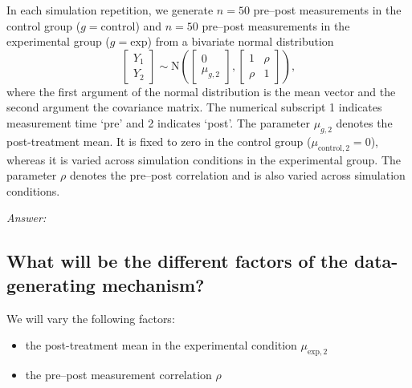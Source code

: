 \documentclass[12pt]{article}
\begin{document}
\begin{examplebox}
In each simulation repetition, we generate $n=50$ pre--post measurements in the control group ($g = \text{control}$) and $n = 50$ pre--post measurements in the experimental group ($g = \text{exp}$) from a bivariate normal distribution
\begin{equation}
    \label{eq:bivariateNormal}
    \left[\begin{array}{c}Y_1 \\ Y_2 \end{array}\right] \sim\text{N}\left(\left[\begin{array}{c}0 \\ \mu_{g,2} \end{array}\right],\left[\begin{array}{cc} 1 & \rho  \\ \rho & 1 \end{array}\right]\right),
\end{equation}
where the first argument of the normal distribution is the mean vector and the second argument the covariance matrix.
The numerical subscript 1 indicates measurement time `pre' and 2 indicates `post'. The parameter $\mu_{g,2}$ denotes the post-treatment mean. It is fixed to zero in the control group (${\mu_{\text{control},2}} = 0$), whereas it is varied across simulation conditions in the experimental group. The parameter $\rho$ denotes the pre--post correlation and is also varied across simulation conditions. 
\end{examplebox}

\textit{Answer:}

\subsection{What will be the different factors of the data-generating mechanism?} 


\begin{examplebox}
We will vary the following factors:
\begin{itemize}
    \item the post-treatment mean in the experimental condition ${\mu_{\text{exp},2}}$
    \item the pre--post measurement correlation $\rho$
\end{itemize}
\end{examplebox}
\end{document}
